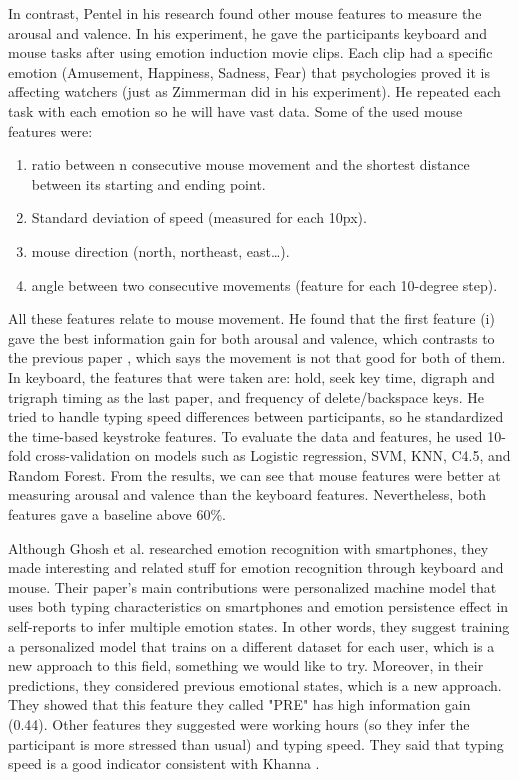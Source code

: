 \documentclass[../main.tex]{subfiles}
\begin{document}
In contrast, Pentel in his research \cite{Pentel} found other mouse features to measure the arousal 
and valence.  In his experiment, he gave the participants keyboard and mouse tasks after using 
emotion induction movie clips. 
Each clip had a specific emotion (Amusement, Happiness, Sadness, Fear) that psychologies proved 
it is affecting watchers (just as Zimmerman did in his experiment). 
He repeated each task with each emotion so he will have vast data. 
Some of the used mouse features were:
\begin{enumerate}[i]
    \item ratio between n consecutive mouse movement and the shortest distance between its starting and ending point. 
    \item Standard deviation of speed (measured for each 10px).
    \item mouse direction (north, northeast, east…). 
    \item angle between two consecutive movements (feature for each 10-degree step).
  \end{enumerate}   
All these features relate to mouse movement. He found that the first feature (i) gave the 
best information gain for both arousal and valence, which contrasts to the previous paper \cite{An_Evaluation_Of_Mouse_And_Keyboard_Interaction}, 
which says the movement is not that good for both of them. 
In keyboard, the features that were taken are: hold, seek key time, digraph and trigraph timing as 
the last paper, and frequency of delete/backspace keys. He tried to handle typing speed differences 
between participants, so he standardized the time-based keystroke features. 
To evaluate the data and features, he used 10-fold cross-validation on models such as 
Logistic regression, SVM, KNN, C4.5, and Random Forest. 
From the results, we can see that mouse features were better at measuring arousal and valence 
than the keyboard features. Nevertheless, both features gave a baseline above 60\%.
\par

Although Ghosh et al. \cite{Ghosh} researched emotion recognition with smartphones, 
they made interesting and related stuff for emotion recognition through keyboard and mouse. 
Their paper's main contributions were personalized machine model that uses both typing 
characteristics on smartphones and emotion persistence effect in self-reports to infer 
multiple emotion states. In other words, they suggest training a personalized model that 
trains on a different dataset for each user, which is a new approach to this field, 
something we would like to try. Moreover, in their predictions, they considered previous 
emotional states, which is a new approach. They showed that this feature they called "PRE" has 
high information gain (0.44). Other features they suggested were working hours 
(so they infer the participant is more stressed than usual) and typing speed. 
They said that typing speed is a good indicator consistent with Khanna \cite{Khanna}.
\par
\end{document}
